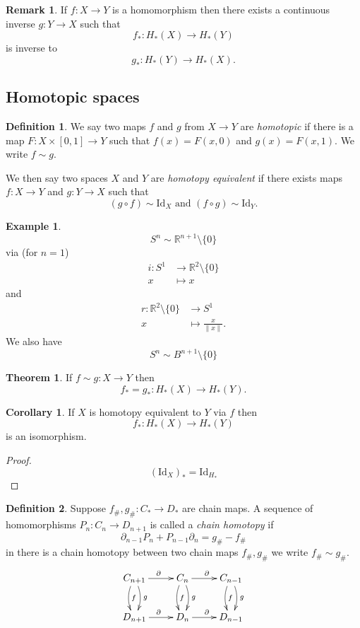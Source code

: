 \documentclass[12pt]{article}
\theoremstyle{definition}
\newtheorem*{thm}{Theorem}
\newtheorem*{cor}{Corollary}
\theoremstyle{definition}
\newtheorem*{defn}{Definition}
\newtheorem*{ex}{Example}
\newtheorem*{rmk}{Remark}
\newcommand{\RR}{\mathbb{R}}
\newcommand{\C}{C_*}
\renewcommand{\H}{H_*}
\begin{document}
\begin{rmk}
If $f\colon X \to Y$ is a homomorphism then there exists a continuous inverse $g\colon Y \to X$ such that
\[
f_* \colon \H(X) \to \H(Y)
\]
is inverse to
\[
g_* \colon \H(Y) \to \H(X).
\]
\end{rmk}

\subsection{Homotopic spaces}
\begin{defn}
We say two maps $f$ and $g$ from $X \to Y$ are \emph{homotopic} if there is a map $F\colon X\times [0,1] \to Y$ such that
$f(x) = F(x,0)$ and $g(x) = F(x,1)$.
We write $f\sim g$.

We then say two spaces $X$ and $Y$ are \emph{homotopy equivalent} if there exists maps $f\colon X\to Y$ and $g\colon Y \to X$ such that
\[
(g\circ f) \sim \mathrm{Id}_X \text{ and } (f\circ g) \sim \mathrm{Id}_Y.
\]
\end{defn}

\begin{ex}
\[
S^n \sim \RR^{n+1}\setminus\{0\}
\]
via (for $n=1$)
\begin{align*}
i\colon S^1 &\to \RR^2\setminus\{0\}\\
x&\mapsto x
\end{align*}
and
\begin{align*}
r\colon \RR^2\setminus\{0\}&\to S^1\\
x&\mapsto \frac{x}{\| x\|}.
\end{align*}
We also have
\[
S^n \sim B^{n+1}\setminus\{0\}
\]
\end{ex}

\begin{thm}
If $f\sim g \colon X \to Y$ then 
\[
f_* = g_*\colon \H(X) \to \H(Y).
\]
\end{thm}
\begin{cor}
If $X$ is homotopy equivalent to $Y$ via $f$ then 
\[
f_* \colon \H(X) \to \H(Y)
\]
is an isomorphism.
\end{cor}
\begin{proof}
\[
(\mathrm{Id}_X)_* = \mathrm{Id}_{\H}
\]
\end{proof}

\begin{defn}
Suppose $f_\#,g_\#\colon\C \to D_*$ are chain maps.
A sequence of homomorphisms $P_n\colon C_n \to D_{n+1}$ is called a \emph{chain homotopy} if
\[
\partial_{n-1} P_n + P_{n-1} \partial_n = g_\# - f_\#
\]
in there is a chain homotopy between two chain maps $f_\#,g_\#$ we write $f_\# \sim g_\#$.
\[
\xymatrix{
C_{n+1} \ar[r]^\partial \ar@/_/[d]^f\ar@/^/[d]^g & C_n \ar@/_/[d]^f\ar@/^/[d]^g\ar[r]^\partial & C_{n-1} \ar@/_/[d]^f\ar@/^/[d]^g\\
D_{n+1} \ar[r]^\partial  & D_n \ar[r]^\partial & D_{n-1}
}
\]
\end{defn}
\end{document}
